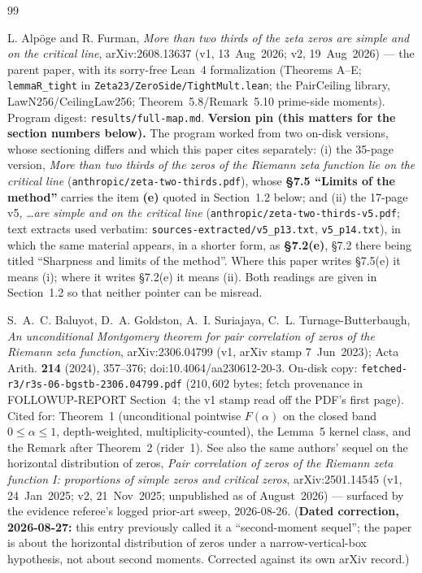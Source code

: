 \documentclass[11pt]{article}
\theoremstyle{plain}
\theoremstyle{definition}
\theoremstyle{remark}
\begin{document}
\begin{thebibliography}{99}

 L. Alp\"oge and R. Furman, \emph{More than two thirds of the zeta
zeros are simple and on the critical line}, arXiv:2608.13637 (v1, 13~Aug~2026;
v2, 19~Aug~2026) --- the parent paper, with its sorry-free Lean~4 formalization
(Theorems A--E; \texttt{lemmaR\_tight} in
\texttt{Zeta23/ZeroSide/TightMult.lean}; the PairCeiling library,
LawN256/CeilingLaw256; Theorem~5.8/Remark~5.10 prime-side moments). Program
digest: \texttt{results/full-map.md}.
\textbf{Version pin (this matters for the section numbers below).} The program
worked from two on-disk versions, whose sectioning differs and which this paper
cites separately:
(i) the 35-page version, \emph{More than two thirds of the zeros of the Riemann
zeta function lie on the critical line}
(\texttt{anthropic/}\allowbreak\texttt{zeta-two-thirds.pdf}), whose
\textbf{\S7.5 ``Limits of the method''} carries the item \textbf{(e)} quoted in
Section~1.2 below; and
(ii) the 17-page v5, \emph{\ldots are simple and on the critical line}
(\texttt{anthropic/}\allowbreak\texttt{zeta-two-thirds-v5.pdf}; text extracts
used verbatim: \texttt{sources-extracted/v5\_p13.txt},
\texttt{v5\_p14.txt}), in which the same material appears, in a shorter form, as
\textbf{\S7.2(e)}, \S7.2 there being titled ``Sharpness and limits of the
method''. Where this paper writes \S7.5(e) it means (i); where it writes
\S7.2(e) it means (ii). Both readings are given in Section~1.2 so that neither
pointer can be misread.

 S.~A.~C. Baluyot, D.~A. Goldston, A.~I. Suriajaya,
C.~L. Turnage-Butterbaugh, \emph{An unconditional Montgomery theorem for pair
correlation of zeros of the Riemann zeta function}, arXiv:2306.04799 (v1, arXiv
stamp 7~Jun~2023); Acta Arith. \textbf{214} (2024), 357--376;
doi:10.4064/aa230612-20-3. On-disk copy:
\texttt{fetched-r3/r3s-06-bgstb-2306.04799.pdf} ($210{,}602$ bytes; fetch
provenance in FOLLOWUP-REPORT Section~4; the v1 stamp read off the PDF's first
page). Cited for: Theorem~1 (unconditional pointwise $F(\alpha)$ on
the closed band $0 \le \alpha \le 1$, depth-weighted, multiplicity-counted), the
Lemma~5 kernel class, and the Remark after Theorem~2 (rider~1). See also the same
authors' sequel on the horizontal distribution of zeros, \emph{Pair correlation of
zeros of the Riemann zeta function I: proportions of simple zeros and critical
zeros}, arXiv:2501.14545 (v1, 24~Jan~2025; v2, 21~Nov~2025; unpublished as of
August~2026) --- surfaced by the evidence referee's logged prior-art sweep,
2026-08-26. (\textbf{Dated correction, 2026-08-27:} this entry previously called it
a ``second-moment sequel''; the paper is about the horizontal distribution of zeros
under a narrow-vertical-box hypothesis, not about second moments. Corrected against
its own arXiv record.)


\end{thebibliography}
\end{document}
